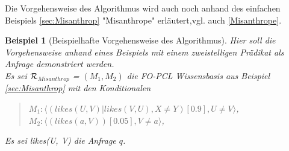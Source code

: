 \documentclass[draft]{scrreprt}
\newtheorem{Bsp}{Beispiel}[section]
\begin{document}
{Die Vorgehensweise des Algorithmus wird auch noch anhand des einfachen Beispiels \ref{sec:Misanthrop} "{}Misanthrope"{} erläutert,vgl. auch \ref{Misanthrope}.
\begin{Bsp}[Beispielhafte Vorgehensweise des Algorithmus] Hier soll die \\ Vorgehensweise anhand eines Beispiels mit einem zweistelligen Prädikat als Anfrage demonstriert werden.\\
	Es sei  $ \cal{R} $$_{Misanthrop}  $ = $ (M_1, M_2)  $ die FO-PCL Wissensbasis aus Beispiel \ref{sec:Misanthrop} mit den Konditionalen 
	\begin{quote}
	$ M_{1}  :  \langle (likes(U, V)|likes(V, U), X \neq Y)[0.9], U \neq V \rangle $,\\
	$ M_{2}  :  \langle (likes(a, V))[0.05], V \neq a \rangle $,\\
	\end{quote}
	Es sei likes(U, V) die Anfrage $ q $.
		$$
\end{Bsp}}
\end{document}
